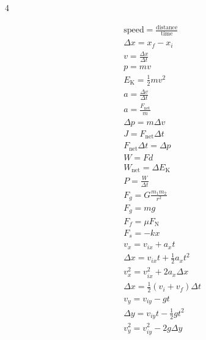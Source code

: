 \documentclass[dvipsnames]{article}
\begin{document}
    



\begin{multicols*}{4}
\setlength{\columnseprule}{1pt}




\begin{align*}
    & \mathrm{speed} = \frac{\mathrm{distance}}{\mathrm{time}} \\[1ex]
    & \Delta x = x_f - x_i \\[1ex]
    & v = \frac{\Delta x}{\Delta t} \\[1ex]
    & p = mv \\[1ex]
    & E_\mathrm{K} = \frac{1}{2} m v^2 \\[1ex]
    & a = \frac{\Delta v}{\Delta t} \\[1ex]
    & a = \frac{F_\mathrm{net}}{m} \\[1ex]
    & \Delta p = m \Delta v \\[1ex]
    & J = F_\mathrm{net} \Delta t \\[1ex]
    & F_\mathrm{net} \Delta t = \Delta p \\[1ex]
    & W = F d \\[1ex]
    & W_\mathrm{net} = \Delta E_\mathrm{K} \\[1ex]
    & P = \frac{W}{\Delta t} \\[1ex]
    & F_g = G \frac{m_1 m_2}{r^2} \\[1ex]
    & F_g = mg \\[1ex]
    & F_f = \mu F_\mathrm{N} \\[1ex]
    & F_s = - kx \\[1ex]
    & v_x = v_{ix} + a_x t \\[1ex]
    & \Delta x = v_{ix} t + \frac{1}{2} a_x t^2 \\[1ex]
    & v_x^2 = v_{ix}^2 + 2 a_x \Delta x \\[1ex]
    & \Delta x = \frac{1}{2}\left(v_i + v_f\right) \Delta t \\[1ex]
    & v_y = v_{iy} - g t \\[1ex]
    & \Delta y = v_{iy} t - \frac{1}{2} g t^2 \\[1ex]
    & v_y^2 = v_{iy}^2 - 2 g \Delta y \\[1ex]
\end{align*}



\end{multicols*}
\end{document}
